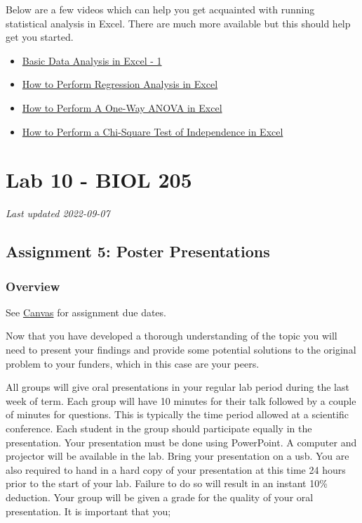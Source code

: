 \documentclass[
]{book}
\providecommand{\tightlist}{%
  \setlength{\itemsep}{0pt}\setlength{\parskip}{0pt}}
\begin{document}
Below are a few videos which can help you get acquainted with running statistical analysis in Excel. There are much more available but this should help get you started.

\begin{itemize}
\tightlist
\item
  \href{https://www.youtube.com/watch?v=2xxMJEj4Oyg}{Basic Data Analysis in Excel - 1}
\item
  \href{https://www.youtube.com/watch?v=0wr9ojMxkuQ}{How to Perform Regression Analysis in Excel}
\item
  \href{https://www.youtube.com/watch?v=ZvfO7-J5u34}{How to Perform A One-Way ANOVA in Excel}
\item
  \href{https://www.youtube.com/watch?v=NDhmMH25AC4}{How to Perform a Chi-Square Test of Independence in Excel}
\end{itemize}

\hypertarget{part-lab-10---biol-205}{%
\part*{Lab 10 - BIOL 205}\label{part-lab-10---biol-205}}

\emph{Last updated 2022-09-07}

\hypertarget{assignment-5-poster-presentations}{%
\chapter*{Assignment 5: Poster Presentations}\label{assignment-5-poster-presentations}}

\hypertarget{overview-3}{%
\section*{Overview}\label{overview-3}}

See \href{https://canvas.ubc.ca}{Canvas} for assignment due dates.

Now that you have developed a thorough understanding of the topic you will need to present your findings and provide some potential solutions to the original problem to your funders, which in this case are your peers.

All groups will give oral presentations in your regular lab period during the last week of term. Each group will have 10 minutes for their talk followed by a couple of minutes for questions. This is typically the time period allowed at a scientific conference. Each student in the group should participate equally in the presentation. Your presentation must be done using PowerPoint. A computer and projector will be available in the lab. Bring your presentation on a usb. You are also required to hand in a hard copy of your presentation at this time 24 hours prior to the start of your lab. Failure to do so will result in an instant 10\% deduction. Your group will be given a grade for the quality of your oral presentation. It is important that you;
\end{document}
